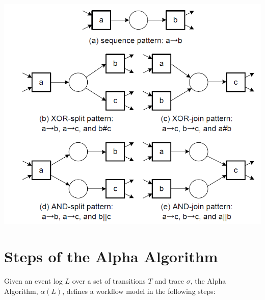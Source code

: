     \begin{center}
        \includegraphics[width=\textwidth]{capitolo 5/5 recap pattern.png}
    \end{center}
    
    \section{Steps of the Alpha Algorithm}
    
    Given an event log \(L\) over a set of transitions \(T\) and trace $\sigma$, the Alpha Algorithm, $\alpha(L)$, defines a workflow model in the following steps:
    
